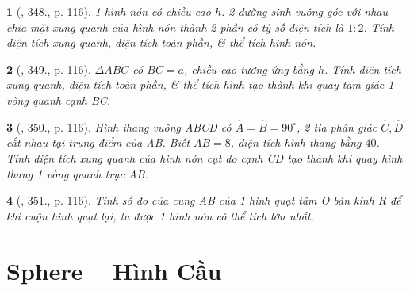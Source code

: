 \documentclass{article}
\newtheorem{baitoan}{}
\begin{document}
\begin{baitoan}[\cite{Binh_Toan_9_tap_2}, 348., p. 116]
	1 hình nón có chiều cao $h$. 2 đường sinh vuông góc với nhau chia mặt xung quanh của hình nón thành 2 phần có tỷ số diện tích là $1:2$. Tính diện tích xung quanh, diện tích toàn phần, \& thể tích hình nón.
\end{baitoan}

\begin{baitoan}[\cite{Binh_Toan_9_tap_2}, 349., p. 116]
	$\Delta ABC$ có $BC = a$, chiều cao tương ứng bằng $h$. Tính diện tích xung quanh, diện tích toàn phần, \& thể tích hình tạo thành khi quay tam giác 1 vòng quanh cạnh BC.
\end{baitoan}

\begin{baitoan}[\cite{Binh_Toan_9_tap_2}, 350., p. 116]
	Hình thang vuông ABCD có $\widehat{A} = \widehat{B} = 90^\circ$, 2 tia phân giác $\widehat{C},\widehat{D}$ cắt nhau tại trung điểm của AB. Biết $AB = 8$, diện tích hình thang bằng $40$. Tính diện tích xung quanh của hình nón cụt do cạnh CD tạo thành khi quay hình thang 1 vòng quanh trục AB.
\end{baitoan}

\begin{baitoan}[\cite{Binh_Toan_9_tap_2}, 351., p. 116]
	Tính số đo của cung AB của 1 hình quạt tâm O bán kính R để khi cuộn hình quạt lại, ta được 1 hình nón có thể tích lớn nhất.
\end{baitoan}


\section{Sphere -- Hình Cầu}
\end{document}
